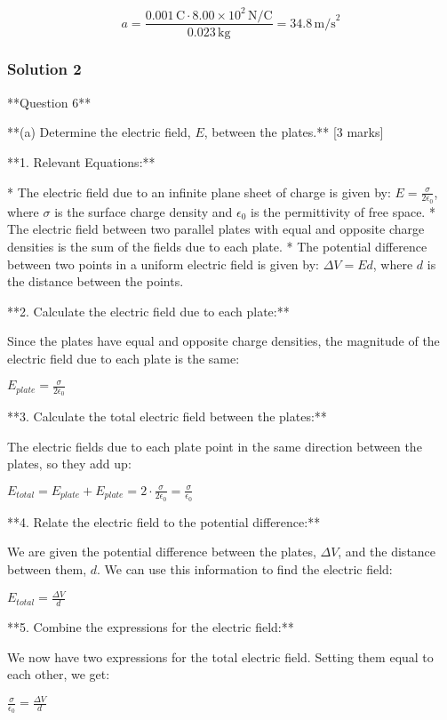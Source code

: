 \documentclass{article}
\begin{document}
\begin{equation*}
a = \frac{0.001 \, \text{C} \cdot 8.00 \times 10^2 \, \text{N/C}}{0.023 \, \text{kg}} = \boxed{34.8 \, \text{m/s}^2}
\end{equation*}

\subsubsection{Solution 2}
**Question 6**

**(a) Determine the electric field, $E$, between the plates.** [3 marks]

**1. Relevant Equations:**

*   The electric field due to an infinite plane sheet of charge is given by:  $E = \frac{\sigma}{2\epsilon_0}$, where $\sigma$ is the surface charge density and $\epsilon_0$ is the permittivity of free space.
*   The electric field between two parallel plates with equal and opposite charge densities is the sum of the fields due to each plate.
*   The potential difference between two points in a uniform electric field is given by: $\Delta V = Ed$, where $d$ is the distance between the points.

**2.  Calculate the electric field due to each plate:**

Since the plates have equal and opposite charge densities, the magnitude of the electric field due to each plate is the same:

$E_{plate} = \frac{\sigma}{2\epsilon_0}$

**3. Calculate the total electric field between the plates:**

The electric fields due to each plate point in the same direction between the plates, so they add up:

$E_{total} = E_{plate} + E_{plate} = 2 \cdot \frac{\sigma}{2\epsilon_0} = \frac{\sigma}{\epsilon_0}$

**4.  Relate the electric field to the potential difference:**

We are given the potential difference between the plates, $\Delta V$, and the distance between them, $d$. We can use this information to find the electric field:

$E_{total} = \frac{\Delta V}{d}$

**5. Combine the expressions for the electric field:**

We now have two expressions for the total electric field. Setting them equal to each other, we get:

$\frac{\sigma}{\epsilon_0} = \frac{\Delta V}{d}$
\end{document}
